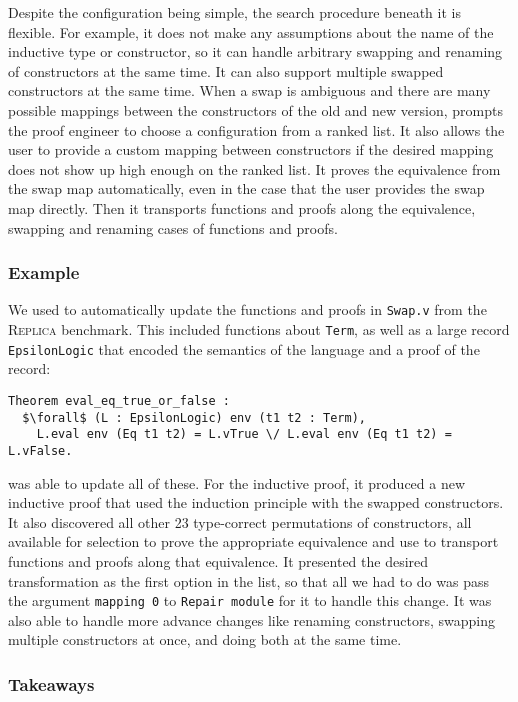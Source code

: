Despite the configuration being simple, the search procedure beneath it is flexible.
For example, it does not make any assumptions about the name of the inductive type or constructor,
so it can handle arbitrary swapping and renaming of constructors at the same time.
It can also support multiple swapped constructors at the same time.
When a swap is ambiguous and there are many possible mappings between the constructors of the old
and new version, \toolname prompts the proof engineer to choose a configuration from a ranked list.
It also allows the user to provide a custom mapping between constructors if the desired mapping
does not show up high enough on the ranked list.
It proves the equivalence from the swap map automatically, even in the case that the user provides
the swap map directly.
Then it transports functions and proofs along the equivalence, swapping and renaming cases of functions
and proofs.

\subsubsection{Example}

We used \toolname to automatically update the functions and proofs in \lstinline{Swap.v} from the \textsc{Replica} benchmark.
This included functions about \lstinline{Term}, as well as a large record \lstinline{EpsilonLogic} that encoded the semantics of the language
and a proof of the record:

\begin{lstlisting}
Theorem eval_eq_true_or_false :
  $\forall$ (L : EpsilonLogic) env (t1 t2 : Term),
    L.eval env (Eq t1 t2) = L.vTrue \/ L.eval env (Eq t1 t2) = L.vFalse.
\end{lstlisting}
\toolname was able to update all of these. For the inductive proof, it produced
a new inductive proof that used the induction principle with the swapped constructors.
It also discovered all other 23 type-correct permutations of constructors, all available for selection to 
prove the appropriate equivalence and use to transport functions and proofs along that equivalence.
It presented the desired transformation as the first option in the list, so that all we had to do
was pass the argument \lstinline{mapping 0} to \lstinline{Repair module} for it to handle this change.
It was also able to handle more advance changes like renaming constructors, swapping multiple constructors at once,
and doing both at the same time.

\subsubsection{Takeaways}

